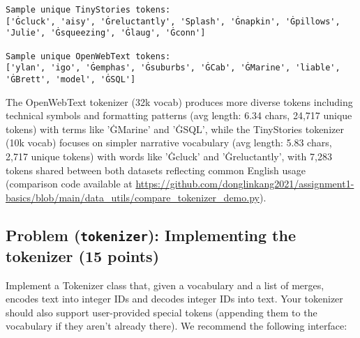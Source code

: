 \documentclass{article}
\newcounter{problem}
\newcommand{\problem}[2]{
    \stepcounter{problem}
    \subsection{Problem (\texttt{#1}): #2}
    \vspace{-1.5em} %
    \noindent
}
\begin{document}
\begin{enumerate}[label=(\alph*)]
\begin{lstlisting}
Sample unique TinyStories tokens:
['Ġcluck', 'aisy', 'Ġreluctantly', 'Splash', 'Ġnapkin', 'Ġpillows', 'Julie', 'Ġsqueezing', 'Ġlaug', 'Ġconn']

Sample unique OpenWebText tokens:
['ylan', 'igo', 'Ġemphas', 'Ġsuburbs', 'ĠCab', 'ĠMarine', 'liable', 'ĠBrett', 'model', 'ĠSQL']
    \end{lstlisting}
    \begin{answer}
    The OpenWebText tokenizer (32k vocab) produces more diverse tokens including technical symbols and formatting patterns (avg length: 6.34 chars, 24,717 unique tokens) with terms like 'ĠMarine' and 'ĠSQL', while the TinyStories tokenizer (10k vocab) focuses on simpler narrative vocabulary (avg length: 5.83 chars, 2,717 unique tokens) with words like 'Ġcluck' and 'Ġreluctantly', with 7,283 tokens shared between both datasets reflecting common English usage (comparison code available at \url{https://github.com/donglinkang2021/assignment1-basics/blob/main/data_utils/compare_tokenizer_demo.py}).
    \end{answer}
\end{enumerate}


\problem{tokenizer}{Implementing the tokenizer (15 points)}

Implement a Tokenizer class that, given a vocabulary and a list of merges, encodes text into integer IDs and decodes integer IDs into text. Your tokenizer should also support user-provided special tokens (appending them to the vocabulary if they aren't already there). We recommend the following interface:
\end{document}
